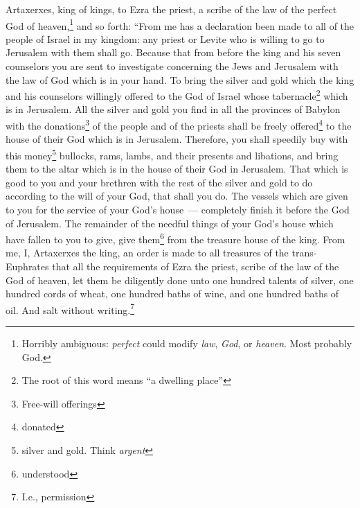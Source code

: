 

\begin{enumerate*}[mode=unboxed]
     Artaxerxes, king of kings, to Ezra the priest, a scribe of the law of the perfect God of heaven,\footnote{Horribly ambiguous: \textit{perfect} could modify \textit{law}, \textit{God}, or \textit{heaven}. Most probably God.} and so forth:%
     ``From me has a declaration been made to all of the people of Israel in my kingdom: any priest or Levite who is willing to go to Jerusalem with them shall go.%
     Because that from before the king and his seven counselors you are sent to investigate concerning the Jews and Jerusalem with the law of God which is in your hand.%
     To bring the silver and gold which the king and his counselors willingly offered to the God of Israel whose tabernacle\footnote{The root of this word means ``a dwelling place''} which is in Jerusalem.%
     All the silver and gold you find in all the provinces of Babylon with the donations\footnote{Free-will offerings} of the people and of the priests shall be freely offered\footnote{donated} to the house of their God which is in Jerusalem.%
     Therefore, you shall speedily buy with this money\footnote{silver and gold. Think \textit{argent}} bullocks, rams, lambs, and their presents and libations, and bring them to the altar which is in the house of their God in Jerusalem.%
     That which is good to you and your brethren with the rest of the silver and gold to do according to the will of your God, that shall you do.%
     The vessels which are given to you for the service of your God's house~--- completely finish it before the God of Jerusalem.%
     The remainder of the needful things of your God's house which have fallen to you to give, give them\footnote{understood} from the treasure house of the king.%
     From me, I, Artaxerxes the king, an order is made to all treasures of the trans-Euphrates that all the requirements of Ezra the priest, scribe of the law of the God of heaven, let them be diligently done%
     unto one hundred talents of silver, one hundred cords of wheat, one hundred baths of wine, and one hundred baths of oil. And salt without writing.\footnote{I.e., permission}%

\end{enumerate*}
